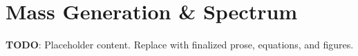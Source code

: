 
\section{Mass Generation & Spectrum}
\label{sec:mass-generation-spectrum}

\textbf{TODO}: Placeholder content. Replace with finalized prose, equations, and figures.

